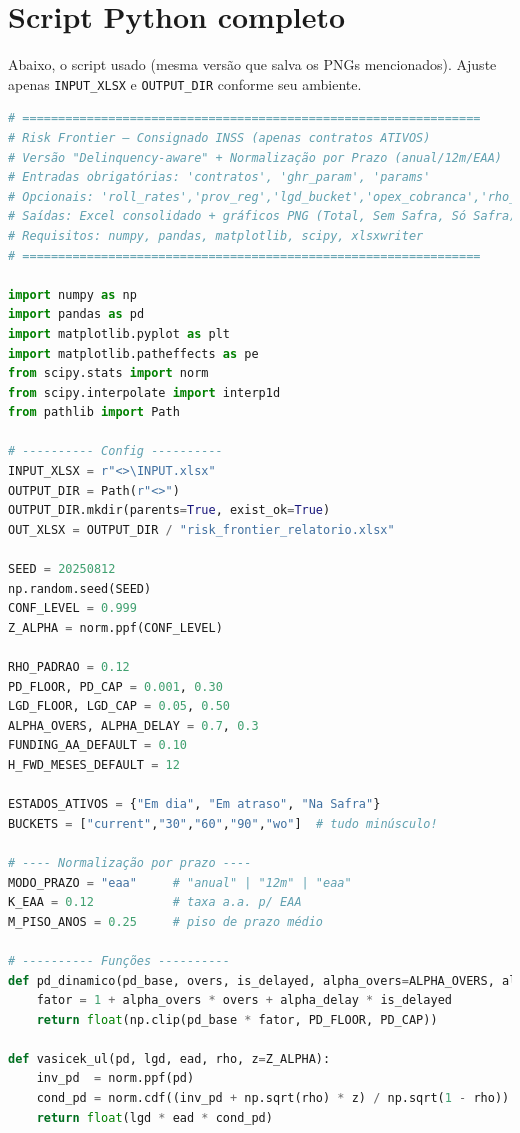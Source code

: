 \documentclass[11pt,a4paper]{article}
\newcommand{\1}{\mathbf{1}}
\begin{document}
\section{Script Python completo}
\noindent Abaixo, o script usado (mesma versão que salva os PNGs mencionados). Ajuste apenas \texttt{INPUT\_XLSX} e \texttt{OUTPUT\_DIR} conforme seu ambiente.
\begin{lstlisting}[language=Python, caption={risk_frontier.py (versão completa com normalização por prazo e visões)}]
# ================================================================
# Risk Frontier – Consignado INSS (apenas contratos ATIVOS)
# Versão "Delinquency-aware" + Normalização por Prazo (anual/12m/EAA)
# Entradas obrigatórias: 'contratos', 'ghr_param', 'params'
# Opcionais: 'roll_rates','prov_reg','lgd_bucket','opex_cobranca','rho_mult_bucket'
# Saídas: Excel consolidado + gráficos PNG (Total, Sem Safra, Só Safra)
# Requisitos: numpy, pandas, matplotlib, scipy, xlsxwriter
# ================================================================

import numpy as np
import pandas as pd
import matplotlib.pyplot as plt
import matplotlib.patheffects as pe
from scipy.stats import norm
from scipy.interpolate import interp1d
from pathlib import Path

# ---------- Config ----------
INPUT_XLSX = r"<>\INPUT.xlsx"
OUTPUT_DIR = Path(r"<>")
OUTPUT_DIR.mkdir(parents=True, exist_ok=True)
OUT_XLSX = OUTPUT_DIR / "risk_frontier_relatorio.xlsx"

SEED = 20250812
np.random.seed(SEED)
CONF_LEVEL = 0.999
Z_ALPHA = norm.ppf(CONF_LEVEL)

RHO_PADRAO = 0.12
PD_FLOOR, PD_CAP = 0.001, 0.30
LGD_FLOOR, LGD_CAP = 0.05, 0.50
ALPHA_OVERS, ALPHA_DELAY = 0.7, 0.3
FUNDING_AA_DEFAULT = 0.10
H_FWD_MESES_DEFAULT = 12

ESTADOS_ATIVOS = {"Em dia", "Em atraso", "Na Safra"}
BUCKETS = ["current","30","60","90","wo"]  # tudo minúsculo!

# ---- Normalização por prazo ----
MODO_PRAZO = "eaa"     # "anual" | "12m" | "eaa"
K_EAA = 0.12           # taxa a.a. p/ EAA
M_PISO_ANOS = 0.25     # piso de prazo médio

# ---------- Funções ----------
def pd_dinamico(pd_base, overs, is_delayed, alpha_overs=ALPHA_OVERS, alpha_delay=ALPHA_DELAY):
    fator = 1 + alpha_overs * overs + alpha_delay * is_delayed
    return float(np.clip(pd_base * fator, PD_FLOOR, PD_CAP))

def vasicek_ul(pd, lgd, ead, rho, z=Z_ALPHA):
    inv_pd  = norm.ppf(pd)
    cond_pd = norm.cdf((inv_pd + np.sqrt(rho) * z) / np.sqrt(1 - rho))
    return float(lgd * ead * cond_pd)


\end{lstlisting}
\end{document}
